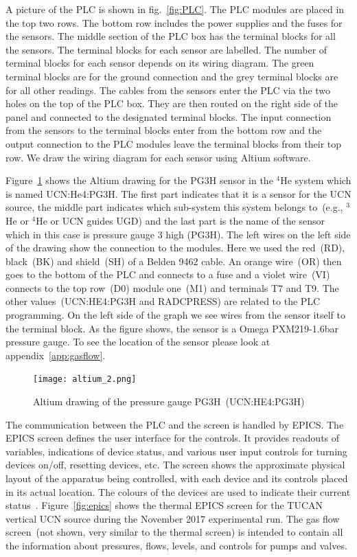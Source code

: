 A picture of the PLC is shown in fig.~\ref{fig:PLC}. The PLC modules
are placed in the top two rows. The bottom row includes the power
supplies and the fuses for the sensors. The middle section of the PLC
box has the terminal blocks for all the sensors. The terminal blocks
for each sensor are labelled. The number of terminal blocks for each
sensor depends on its wiring diagram. The green terminal blocks are
for the ground connection and the grey terminal blocks are for all
other readings.  The cables from the sensors enter the PLC via the two
holes on the top of the PLC box. They are then routed on the right
side of the panel and connected to the designated terminal blocks. The
input connection from the sensors to the terminal blocks enter from
the bottom row and the output connection to the PLC modules leave the
terminal blocks from their top row. We draw the wiring diagram for
each sensor using Altium software.

Figure~\ref{fig:altium} shows the Altium drawing for the PG3H sensor
in the $^4$He system which is named UCN:He4:PG3H. The first part
indicates that it is a sensor for the UCN source, the middle part
indicates which sub-system this system belongs to~(e.g., $^3$He or
$^4$He or UCN guides UGD) and the last part is the name of the sensor
which in this case is pressure gauge 3 high (PG3H). The left wires on
the left side of the drawing show the connection to the modules. Here
we used the red~(RD), black~(BK) and shield~(SH) of a Belden 9462
cable. An orange wire~(OR) then goes to the bottom of the PLC and
connects to a fuse and a violet wire~(VI) connects to the top row~(D0)
module one~(M1) and terminals T7 and T9. The other
values~(UCN:HE4:PG3H and RADCPRESS) are related to the PLC
programming. On the left side of the graph we see wires from the
sensor itself to the terminal block. As the figure shows, the sensor is
a Omega PXM219-1.6bar pressure gauge. To see the location of the
sensor please look at appendix~\ref{app:gasflow}.

\begin{figure}[h!]
  \centering
  \texttt{[image: altium\_2.png]}
  \caption{Altium drawing of the pressure gauge PG3H~(UCN:HE4:PG3H) }
  \label{fig:altium}
\end{figure}



The communication between the PLC and the screen is handled by EPICS.
The EPICS screen defines the user interface for the controls. It
provides readouts of variables, indications of device status, and
various user input controls for turning devices on/off, resetting
devices, etc. The screen shows the approximate physical layout of the
apparatus being controlled, with each device and its controls placed
in its actual location. The colours of the devices are used to
indicate their current status~\cite{Sean_manual}. Figure~\ref{fig:epics}
shows the thermal EPICS screen for the TUCAN vertical UCN source
during the November 2017 experimental run. The gas flow screen~(not
shown, very similar to the thermal screen) is intended to contain all
the information about pressures, flows, levels, and controls for pumps and
valves.

